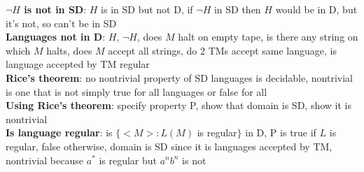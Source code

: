 \documentclass[a4paper]{article}
\begin{document}
\begin{multicols}{2}
        \boldmath\textbf{$\neg H$ is not in SD}\unboldmath: $H$ is in SD but not D, if $\neg H$ in SD then $H$ would be in D, but it's not, so can't be in SD\\
        \textbf{Languages not in D}: $H$, $\neg H$, does $M$ halt on empty tape, is there any string on which $M$ halts, does $M$ accept all strings, do 2 TMs accept same language, is language accepted by TM regular\\
        \textbf{Rice's theorem}: no nontrivial property of SD languages is decidable, nontrivial is one that is not simply true for all languages or false for all\\
        \textbf{Using Rice's theorem}: specify property P, show that domain is SD, show it is nontrivial\\
        \textbf{Is language regular}: is $\{<M>: L(M)$ is regular$\}$ in D, P is true if $L$ is regular, false otherwise, domain is SD since it is languages accepted by TM, nontrivial because $a^*$ is regular but $a^n b^n$ is not\\
    \end{multicols}
    
\end{document}
